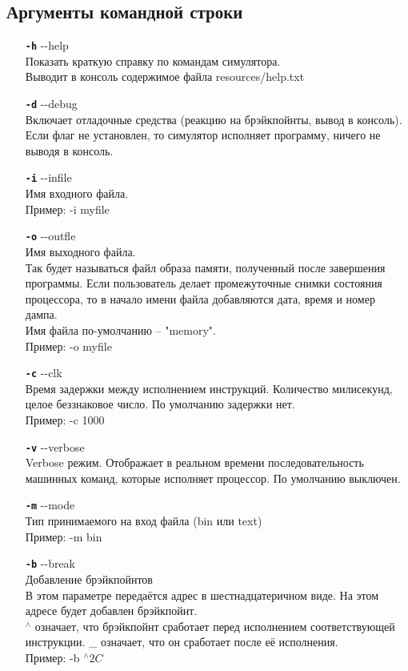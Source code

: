 \subsection{Аргументы командной строки}
\begin{enumerate}
	\item[{\tt\bf -h}] {-}-help \\
	Показать краткую справку по командам симулятора. \\
	Выводит в консоль содержимое файла resources/help.txt
	
	\item[{\tt\bf -d}] {-}-debug \\
	Включает отладочные средства (реакцию на брэйкпойнты, вывод в консоль).
	Если флаг не  установлен, то симулятор исполняет программу, ничего не выводя в консоль.
	
	\item[{\tt\bf -i}] {-}-infile \\
	Имя входного файла. \\
	Пример: -i myfile
	
	\item[{\tt\bf -o}] {-}-outfle \\
	Имя выходного файла. \\ 
	Так будет называться файл образа памяти, полученный после завершения программы. Если пользователь делает промежуточные снимки состояния процессора, то в начало имени файла добавляются дата, время и номер дампа.\\
	Имя файла по-умолчанию -- "memory".\\
	Пример: -o myfile
	
	\item[{\tt\bf -c}] {-}-clk \\
	Время задержки между исполнением инструкций. Количество милисекунд, целое беззнаковое число. По умолчанию задержки нет.\\
	Пример: -c 1000
	
	\item[{\tt\bf -v}] {-}-verbose \\
	Verbose режим. Отображает в реальном времени последовательность машинных команд, которые исполняет процессор. По умолчанию выключен.
	
	\item[{\tt\bf -m}] {-}-mode \\
	Тип принимаемого на вход файла (bin или text) \\
	Пример: -m bin
	
	\item[{\tt\bf -b}] {-}-break \\
	Добавление брэйкпойнтов \\
	В этом параметре передаётся адрес в шестнадцатеричном виде. На этом адресе будет добавлен брэйкпойнт. \\
	$^\wedge$ означает, что брэйкпойнт сработает перед исполнением соответствующей инструкции. \_ означает, что он сработает после её исполнения. \\
	Пример: -b $^\wedge2C$
	

\end{enumerate}
